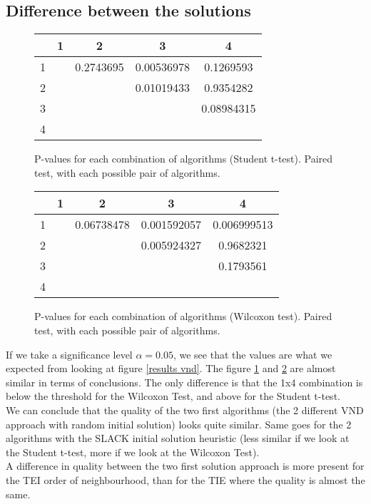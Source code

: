 \subsection{Difference between the solutions}

\begin{figure}[H]
\begin{center}
\begin{tabular}{|c|c|c|c|c|} \hline
	
	& 1 & 2 & 3 & 4 \\ \hline \hline
	
	1 & & 0.2743695 & 0.00536978 & 0.1269593 \\ \hline
	2 & & & 0.01019433 & 0.9354282 \\ \hline
	3 & & & & 0.08984315 \\ \hline
	4 & & & & \\ \hline

\end{tabular}
\end{center}
\caption{P-values for each combination of algorithms (Student t-test). Paired test, with each possible pair of algorithms.}
\label{pv vnd st}
\end{figure}

\begin{figure}[H]
\begin{center}
\begin{tabular}{|c|c|c|c|c|} \hline
	
	& 1 & 2 & 3 & 4 \\ \hline \hline
	
	1 & & 0.06738478 & 0.001592057 & 0.006999513 \\ \hline
	2 & & & 0.005924327 & 0.9682321 \\ \hline
	3 & & & & 0.1793561 \\ \hline
	4 & & & & \\ \hline

\end{tabular}
\end{center}
\caption{P-values for each combination of algorithms (Wilcoxon test). Paired test, with each possible pair of algorithms.}
\label{pv vnd wil}
\end{figure}

If we take a significance level $\alpha = 0.05$, we see that the values are what we expected from looking at figure \ref{results vnd}. The figure \ref{pv vnd st} and \ref{pv vnd wil} are almost similar in terms of conclusions. The only difference is that the 1x4 combination is below the threshold for the Wilcoxon Test, and above for the Student t-test.\\

We can conclude that the quality of the two first algorithms (the 2 different VND approach with random initial solution) looks quite similar. Same goes for the 2 algorithms with the SLACK initial solution heuristic (less similar if we look at the Student t-test, more if we look at the Wilcoxon Test).\\

A difference in quality between the two first solution approach is more present for the TEI order of neighbourhood, than for the TIE where the quality is almost the same.

